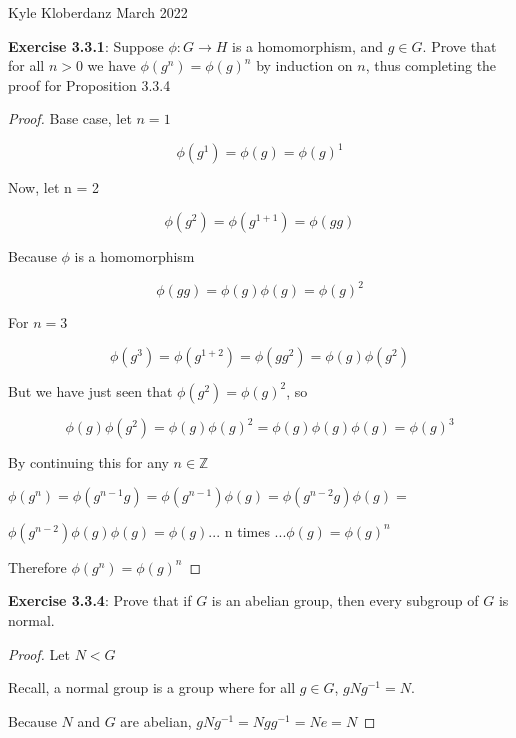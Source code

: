\documentclass[a4paper]{article}
\begin{document}
\begin{myparindent}{0pt}

Kyle Kloberdanz  March 2022 \newline

\textbf{Exercise 3.3.1}:
Suppose $\phi: G \rightarrow H$ is a homomorphism, and $g \in G$. Prove that
for all $n > 0$ we have $\phi(g^n) = \phi(g)^n$ by induction on $n$, thus
completing the proof for Proposition 3.3.4
\newline

\begin{proof}

Base case, let $n = 1$

\[ \phi(g^1) = \phi(g) = \phi(g)^1 \]

Now, let n = 2

\[ \phi(g^2) = \phi(g^{1 + 1}) = \phi(gg) \]

Because $\phi$ is a homomorphism

\[ \phi(gg) = \phi(g) \phi(g) = \phi(g)^2 \]

For $n = 3$

\[ \phi(g^3) = \phi(g^{1 + 2}) = \phi(gg^2) = \phi(g) \phi(g^2) \]

But we have just seen that $\phi(g^2) = \phi(g)^2$, so

\[ \phi(g) \phi(g^2) = \phi(g) \phi(g)^2 = \phi(g) \phi(g) \phi(g) = \phi(g)^3 \]

By continuing this for any $n \in \mathbb{Z}$
\newline

$\phi(g^n) = \phi(g^{n - 1}g) = \phi(g^{n - 1}) \phi(g) = \phi(g^{n - 2}g) \phi(g) =$

$\phi(g^{n-2}) \phi(g) \phi(g) = \phi(g) ...$ n times $... \phi(g) = \phi(g)^n$
\newline

Therefore $\phi(g^n) = \phi(g)^n$
\end{proof}

\textbf{Exercise 3.3.4}:
Prove that if $G$ is an abelian group, then every subgroup of $G$ is normal.
\newline

\begin{proof}

Let $N < G$

Recall, a normal group is a group where for all $g \in G$, $gNg^{-1} = N$.

Because $N$ and $G$ are abelian, $gNg^{-1} = Ngg^{-1} = Ne = N$


\end{proof}
\end{myparindent}
\end{document}
